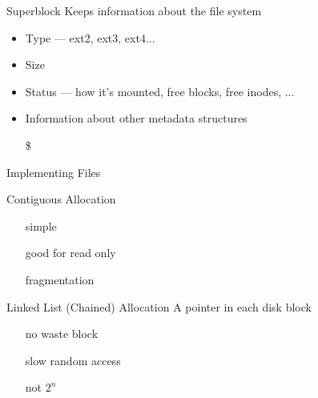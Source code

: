 \begin{frame}
  \begin{block}{Superblock}
    Keeps information about the file system
    \begin{itemize}
    \item Type --- ext2, ext3, ext4...
    \item Size
    \item Status --- how it's mounted, free blocks, free inodes, ...
    \item Information about other metadata structures
    \end{itemize}
  \end{block}
  \begin{itemize}
  \item[\$] 
  \end{itemize}
\end{frame}

\begin{frame}{Implementing Files}
  \begin{center}
  \end{center}
  \begin{block}{Contiguous Allocation}
    \begin{multicols}{2}
      \begin{itemize}
      \item[\Good] simple
      \item[\Good] good for read only
      \item[\Bad] fragmentation
      \end{itemize}
    \end{multicols}
  \end{block}
\end{frame}

\begin{frame}
  \begin{center}
  \end{center}
  \begin{block}{Linked List (Chained) Allocation}
    A pointer in each disk block
    \begin{multicols}{2}
      \begin{itemize}
      \item[\Good] no waste block
      \item[\Bad] slow random access
      \item[\Bad] not $2^n$
      \end{itemize}
    \end{multicols}
  \end{block}
\end{frame}

